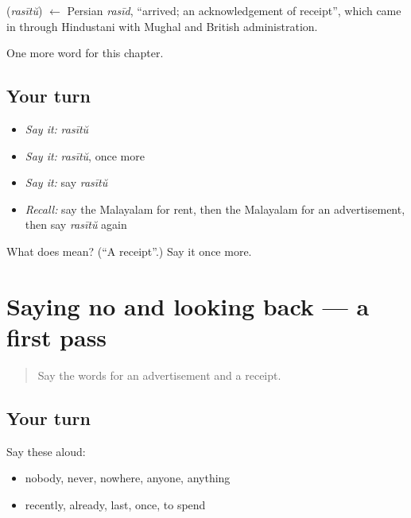 \begin{cousinweb}
\textbf{} (\emph{rasītŭ}) $\leftarrow$ Persian \emph{rasīd}, \textquotedblleft{}arrived; an acknowledgement of receipt\textquotedblright{}, which came in through Hindustani with Mughal and British administration.
\end{cousinweb}

\begin{grammarlens}[title={What you've built}]
One more word for this chapter.
\end{grammarlens}

\subsection*{Your turn}
\begin{itemize}
\raggedright
  \item \emph{Say it:} \emph{rasītŭ}
  \item \emph{Say it:} \emph{rasītŭ}, once more
  \item \emph{Say it:} say \emph{rasītŭ}
  \item \emph{Recall:} say the Malayalam for rent, then the Malayalam for an advertisement, then say \emph{rasītŭ} again
\end{itemize}

\begin{tcolorbox}[breakable,colback=teal!4,colframe=teal!35!black,title={Before you move on}]
What does  mean? (\textquotedblleft{}A receipt\textquotedblright{}.) Say it once more.
\end{tcolorbox}
\section[(dialogue)]{Saying no and looking back — a first pass}

\label{lesson:ML-R180-first-pass-saying-no-and-looking-back}



\begin{quote}
Say the words for an advertisement and a receipt.
\end{quote}

\subsection*{Your turn}
Say these aloud:

\begin{itemize}
\raggedright
  \item nobody, never, nowhere, anyone, anything
  \item recently, already, last, once, to spend
\end{itemize}

